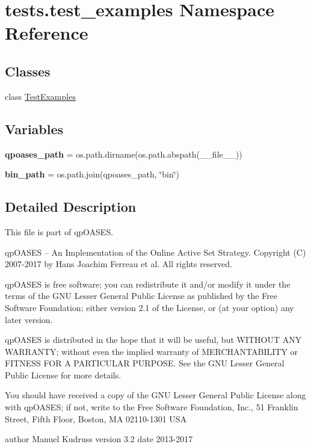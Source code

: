\hypertarget{namespacetests_1_1test__examples}{}\section{tests.\+test\+\_\+examples Namespace Reference}
\label{namespacetests_1_1test__examples}
\subsection*{Classes}
\begin{DoxyCompactItemize}
\item 
class \hyperlink{classtests_1_1test__examples_1_1_test_examples}{Test\+Examples}
\end{DoxyCompactItemize}
\subsection*{Variables}
\begin{DoxyCompactItemize}
\item 
\mbox{\label{namespacetests_1_1test__examples_a353fb84679c2305d5fbb7b354d7bb7df}} 
{\bfseries qpoases\+\_\+path} = os.\+path.\+dirname(os.\+path.\+abspath(\+\_\+\+\_\+file\+\_\+\+\_\+))
\item 
\mbox{\label{namespacetests_1_1test__examples_af0318e3bffddc9ac5aa715effb8f48d8}} 
{\bfseries bin\+\_\+path} = os.\+path.\+join(qpoases\+\_\+path, \char`\"{}bin\char`\"{})
\end{DoxyCompactItemize}


\subsection{Detailed Description}
\begin{DoxyVerb}This file is part of qpOASES.

qpOASES -- An Implementation of the Online Active Set Strategy.
Copyright (C) 2007-2017 by Hans Joachim Ferreau et al. All rights reserved.

qpOASES is free software; you can redistribute it and/or
modify it under the terms of the GNU Lesser General Public
License as published by the Free Software Foundation; either
version 2.1 of the License, or (at your option) any later version.

qpOASES is distributed in the hope that it will be useful,
but WITHOUT ANY WARRANTY; without even the implied warranty of
MERCHANTABILITY or FITNESS FOR A PARTICULAR PURPOSE.
See the GNU Lesser General Public License for more details.

You should have received a copy of the GNU Lesser General Public
License along with qpOASES; if not, write to the Free Software
Foundation, Inc., 51 Franklin Street, Fifth Floor, Boston, MA  02110-1301  USA

author Manuel Kudruss
version 3.2
date 2013-2017
\end{DoxyVerb}
 